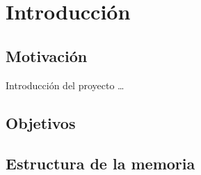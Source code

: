 
\chapter{Introducción}
\label{cha:introduccion}

\section{Motivación}
\label{sec:motivacion}

Introducción del proyecto \ldots

\section{Objetivos}
\label{sec:objetivos}

\section{Estructura de la memoria}
\label{sec:estructura-memoria}

